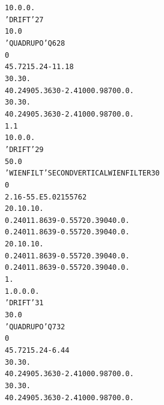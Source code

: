 \begin{tiny}
\begin{alltt}
    1  0. 0. 0.                                                                 
   'DRIFT'                                                                27
     10.0                                                                       
   'QUADRUPO'                            Q6                               28
   0                                                        
    45.72  15.24  -11.18                                                        
    30. 30.                                                                     
    4    0.2490   5.3630  -2.4100   0.9870   0.   0.                            
    30. 30.                                                                     
    4    0.2490   5.3630  -2.4100   0.9870   0.   0.                            
     1.1                                                                        
    1  0. 0. 0.                                                                 
   'DRIFT'                                                                29
     50.0                                                                       
    'WIENFILT'                           SECOND  VERTICAL  WIEN  FILTER   30
    0                                                       
   2.16  -55.E5  .0215576  2                                                    
   20. 10. 10.                                                                  
   0.2401  1.8639  -0.5572  0.3904 0. 0.                                        
   0.2401  1.8639  -0.5572  0.3904 0. 0.                                        
   20. 10. 10.                                                                  
   0.2401  1.8639  -0.5572  0.3904 0. 0.                                        
   0.2401  1.8639  -0.5572  0.3904 0. 0.                                        
   1.                                                       
  1. 0. 0. 0.                                                                   
   'DRIFT'                                                                31
     30.0                                                                       
   'QUADRUPO'                            Q7                               32
   0                                                        
    45.72  15.24  -6.44                                                         
    30. 30.                                                                     
    4    0.2490   5.3630  -2.4100   0.9870   0.   0.                            
    30. 30.                                                                     
    4    0.2490   5.3630  -2.4100   0.9870   0.   0.                            

\end{alltt}
\end{tiny}
